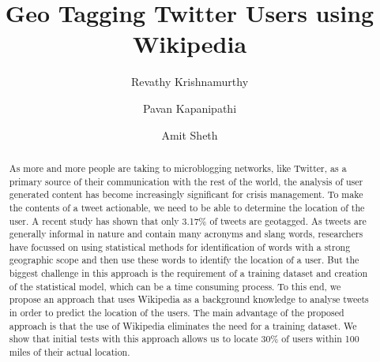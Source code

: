 \documentclass[runningheads,a4paper]{llncs}
\begin{document}
\mainmatter  %

\title{Geo Tagging Twitter Users using Wikipedia}


\author{Revathy Krishnamurthy\and Pavan Kapanipathi\and Amit Sheth}



\maketitle

\begin{abstract}
As more and more people are taking to microblogging networks, like Twitter, as a primary source of their communication with the rest of the world, the analysis of user generated content has become increasingly significant for crisis management. To make the contents of a tweet actionable, we need to be able to determine the location of the user. A recent study has shown that only 3.17\% of tweets are geotagged. As tweets are generally informal in nature and contain many acronyms and slang words, researchers have focussed on using statistical methods for identification of words with a strong geographic scope and then use these words to identify the location of a user. But the biggest challenge in this approach is the requirement of a training dataset and creation of the statistical model, which can be a time consuming process. To this end, we propose an approach that uses Wikipedia as a background knowledge to analyse tweets in order to predict the location of the users. The main advantage of the proposed approach is that the use of Wikipedia eliminates the need for a training dataset. We show that initial tests with this approach allows us to locate 30\% of users within 100 miles of their actual location.

\end{abstract}


 





\end{document}
